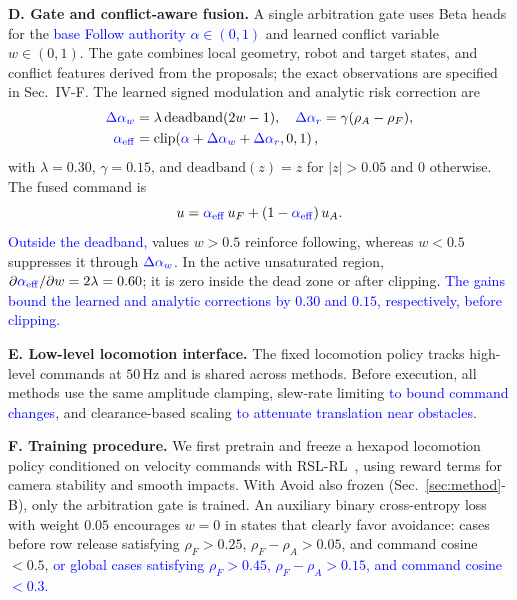 \documentclass[letterpaper, 10 pt, conference]{ieeeconf}
\newcommand{\uF}{u_{F}}
\newcommand{\uA}{u_{A}}
\newcommand{\alphaeff}{\alpha_{\mathrm{eff}}}
\newcommand{\rFdir}{\rho_F}
\newcommand{\rAdir}{\rho_A}
\newcommand{\rev}[1]{\textcolor{blue}{#1}}
\begin{document}
\textbf{D. Gate and conflict-aware fusion.}
A single arbitration gate uses Beta heads for the \rev{base Follow authority $\alpha\in(0,1)$}
and learned conflict variable $w\in(0,1)$. The gate combines local geometry, robot and target states, and conflict features derived from the proposals; the exact observations are specified in Sec.~IV-F.
The learned signed modulation and analytic risk correction
are
\begin{align}
\rev{\Delta\alpha_w} &= \lambda\,\mathrm{deadband}(2w-1),\quad
\rev{\Delta\alpha_r} = \gamma(\rAdir-\rFdir), \\
\rev{\alphaeff} &= \mathrm{clip}\!\left(\rev{\alpha}+\rev{\Delta\alpha_w}+\rev{\Delta\alpha_r},0,1\right),
\end{align}
with $\lambda=0.30$, $\gamma=0.15$, and
$\mathrm{deadband}(z)=z$ for $|z|>0.05$ and $0$ otherwise. The fused
command is
\begin{equation}
u = \rev{\alphaeff}\,\uF + (1-\rev{\alphaeff})\,\uA.
\label{eq:fusion}
\end{equation}
\rev{Outside the deadband,} values $w>0.5$ reinforce following, whereas $w<0.5$ suppresses it through
$\rev{\Delta\alpha_w}$. In the active unsaturated region,
$\partial\rev{\alphaeff}/\partial w=2\lambda=0.60$; it is zero inside the
dead zone or after clipping. \rev{The gains bound the learned and analytic corrections by $0.30$ and $0.15$, respectively, before clipping.}

\textbf{E. Low-level locomotion interface.}
The fixed locomotion policy tracks high-level commands at $50\,\mathrm{Hz}$ and is shared across methods. Before execution, all methods use the same amplitude clamping, slew-rate limiting \rev{to bound command changes}, and clearance-based scaling \rev{to attenuate translation near obstacles}.

\textbf{F. Training procedure.}
We first pretrain and freeze a hexapod locomotion policy conditioned on velocity commands with RSL-RL~\cite{ref:rudin}, using reward terms for camera stability and smooth impacts. With Avoid also frozen (Sec.~\ref{sec:method}-B), only the arbitration gate is trained. An auxiliary binary cross-entropy loss with weight $0.05$ encourages $w=0$ in states that clearly favor avoidance:
cases before row release satisfying $\rFdir>0.25$,
$\rFdir-\rAdir>0.05$, and command cosine $<0.5$, \rev{or global cases satisfying $\rFdir>0.45$, $\rFdir-\rAdir>0.15$, and command cosine $<0.3$.}
\end{document}
